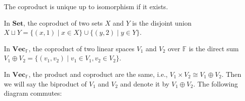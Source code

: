 \documentclass[
	11pt, %
	fleqn, %
	a4paper, %
]{LegrandOrangeBook}
\newcommand{\F}{\mathbb{F}} %
\newcommand{\Set}{\textbf{Set}} %
\newcommand{\Vect}{\textbf{Vec}} %
\begin{document}
\begin{remark}
    The coproduct is unique up to isomorphism if it exists.
\end{remark}

\begin{example}
    In $\Set$, the coproduct of two sets $X$ and $Y$ is the disjoint union $X \sqcup Y = \{ (x, 1) \mid x \in X \} \cup \{ (y, 2) \mid y \in Y \}$.
\end{example}

\begin{example}
    In $\Vect_{\F}$, the coproduct of two linear spaces $V_1$ and $V_2$ over $\F$ is the direct sum $V_1 \oplus V_2 = \{ (v_1, v_2) \mid v_1 \in V_1, v_2 \in V_2 \}$.
\end{example}

In $\Vect_{\F}$, the product and coproduct are the same, i.e., $V_1 \times V_2 \cong V_1 \oplus V_2$. Then we will say the biproduct of $V_1$ and $V_2$ and denote it by $V_1 \oplus V_2$. The following diagram commutes:
\begin{center}
\end{center}

\end{document}

